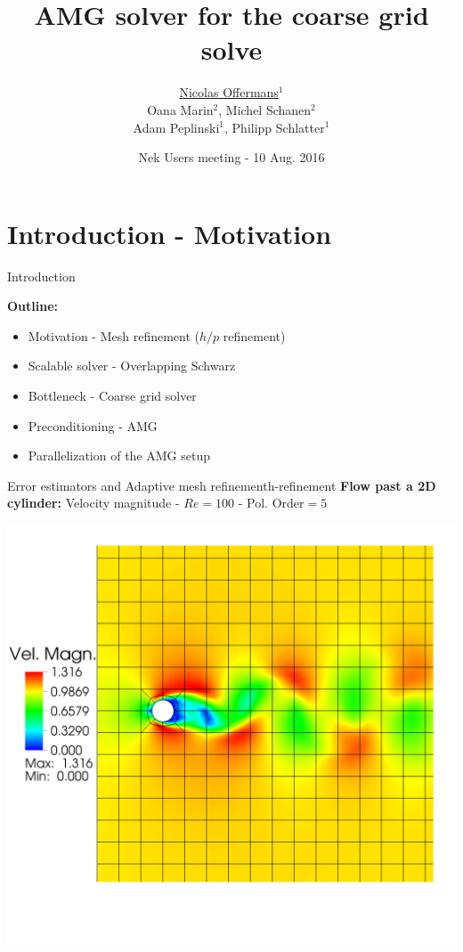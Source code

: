 \documentclass[usenames,dvipsnames,svgnames,9pt]{beamer}
\title[AMG solver for the coarse grid solve] %
{
	AMG solver for the coarse grid solve %
}
\author[Nicolas Offermans] %
{
	\underline{Nicolas Offermans}$^1$ \\
    Oana Marin$^2$, Michel Schanen$^2$ \\
	Adam Peplinski$^1$, Philipp Schlatter$^1$ 
}
\institute[unused]
{
	$^1$Linn\'e FLOW Centre, KTH Mechanics \\
	$^2$Argonne National Laboratory
}
\date[unused]
	{Nek Users meeting - 10 Aug. 2016}
\begin{document}
\titleframe %


\section{Introduction - Motivation}

\begin{frame}{Introduction}{}

\textbf{Outline:}

\begin{itemize}
\item Motivation - Mesh refinement ($h/p$ refinement)
\item Scalable solver - Overlapping Schwarz
\item Bottleneck - Coarse grid solver
\item Preconditioning - AMG
\item Parallelization of the AMG setup
\vspace{5mm}
\end{itemize}

\end{frame}


\begin{frame}{Error estimators and Adaptive mesh refinement}{h-refinement}
\textbf{Flow past a 2D cylinder:} Velocity magnitude - $Re=100$ - Pol. Order$ = 5$

\centering
  \includegraphics[trim={0 14.5cm 0 7.2cm},clip, width=0.8\linewidth]{vel_init} 
\end{frame}
\end{document}
